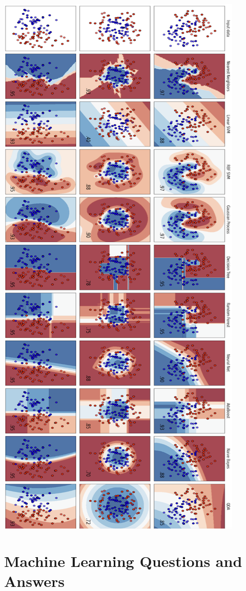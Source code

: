 \documentclass[10pt,a4paper]{article}
\begin{document}
\includegraphics[scale=0.8]{Screenshot 2025-01-09 at 17.35.36.png}
\section*{Machine Learning Questions and Answers}
\end{document}
